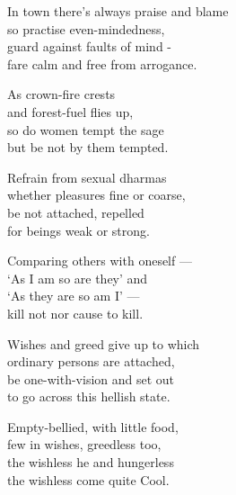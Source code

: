 \begin{MyDescription}{}
In town there's always praise and blame\\
so practise even-mindedness,\\
guard against faults of mind -\\
fare calm and free from arrogance.
\end{MyDescription} 

\begin{MyDescription}{}
As crown-fire crests\\
and forest-fuel flies up,\\
so do women tempt the sage\\
but be not by them tempted.
\end{MyDescription} 

\begin{MyDescription}{}
Refrain from sexual dharmas\\
whether pleasures fine or coarse,\\
be not attached, repelled\\
for beings weak or strong.
\end{MyDescription} 

\begin{MyDescription}{}
Comparing others with oneself —\\
`As I am so are they' and\\
`As they are so am I' —\\
kill not nor cause to kill.
\end{MyDescription} 

\begin{MyDescription}{}
Wishes and greed give up to which\\
ordinary persons are attached,\\
be one-with-vision and set out\\
to go across this hellish state.
\end{MyDescription} 

\begin{MyDescription}{}
Empty-bellied, with little food,\\
few in wishes, greedless too,\\
the wishless he and hungerless\\
the wishless come quite Cool.
\end{MyDescription} 


